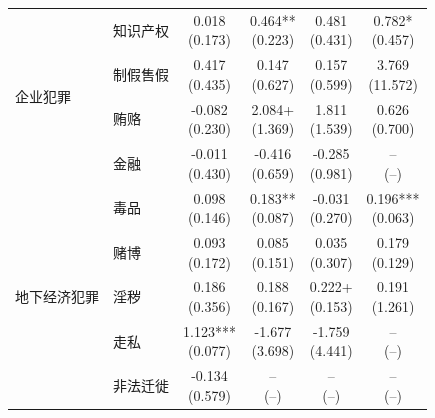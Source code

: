 \documentclass[a4paper,12pt]{report}
\begin{document}
\begin{table}[H]
\begin{tabular*}{\textwidth}{@{\extracolsep{\fill}}llcccc}
\midrule
\multirow{4}{*}{企业犯罪} & 知识产权 & \makecell{0.018\\(0.173)} & \makecell{0.464**\\(0.223)} & \makecell{0.481\\(0.431)} & \makecell{0.782*\\(0.457)} \\
 & 制假售假 & \makecell{0.417\\(0.435)} & \makecell{0.147\\(0.627)} & \makecell{0.157\\(0.599)} & \makecell{3.769\\(11.572)} \\
 & 贿赂 & \makecell{-0.082\\(0.230)} & \makecell{2.084+\\(1.369)} & \makecell{1.811\\(1.539)} & \makecell{0.626\\(0.700)} \\
 & 金融 & \makecell{-0.011\\(0.430)} & \makecell{-0.416\\(0.659)} & \makecell{-0.285\\(0.981)} & \makecell{--\\(--)} \\
\midrule
\multirow{5}{*}{地下经济犯罪} & 毒品 & \makecell{0.098\\(0.146)} & \makecell{0.183**\\(0.087)} & \makecell{-0.031\\(0.270)} & \makecell{0.196***\\(0.063)} \\
 & 赌博 & \makecell{0.093\\(0.172)} & \makecell{0.085\\(0.151)} & \makecell{0.035\\(0.307)} & \makecell{0.179\\(0.129)} \\
 & 淫秽 & \makecell{0.186\\(0.356)} & \makecell{0.188\\(0.167)} & \makecell{0.222+\\(0.153)} & \makecell{0.191\\(1.261)} \\
 & 走私 & \makecell{1.123***\\(0.077)} & \makecell{-1.677\\(3.698)} & \makecell{-1.759\\(4.441)} & \makecell{--\\(--)} \\
 & 非法迁徙 & \makecell{-0.134\\(0.579)} & \makecell{--\\(--)} & \makecell{--\\(--)} & \makecell{--\\(--)} \\
\bottomrule
\end{tabular*}
\endgroup
\vspace{0.15cm}


\end{table}
\end{document}
